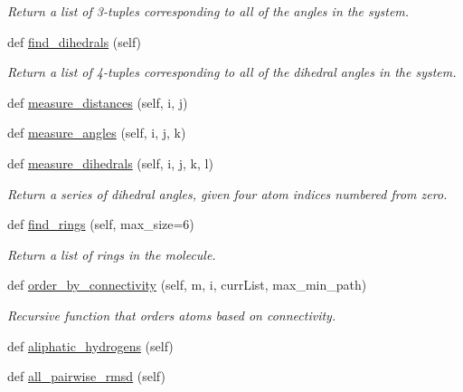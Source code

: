 \begin{DoxyCompactItemize}
\begin{DoxyCompactList}\small\item\em Return a list of 3-\/tuples corresponding to all of the angles in the system. \end{DoxyCompactList}\item 
def \hyperlink{classsrc_1_1molecule_1_1Molecule_ac07431c9d938d6f0e24e71beef9119c5}{find\+\_\+dihedrals} (self)
\begin{DoxyCompactList}\small\item\em Return a list of 4-\/tuples corresponding to all of the dihedral angles in the system. \end{DoxyCompactList}\item 
def \hyperlink{classsrc_1_1molecule_1_1Molecule_a2a818455c2439cd42f7489d3f811eb72}{measure\+\_\+distances} (self, i, j)
\item 
def \hyperlink{classsrc_1_1molecule_1_1Molecule_ad9a055066973a760e4898581224736b0}{measure\+\_\+angles} (self, i, j, k)
\item 
def \hyperlink{classsrc_1_1molecule_1_1Molecule_a4c1539dbe8854e261e7dbdb4a6fa0a98}{measure\+\_\+dihedrals} (self, i, j, k, l)
\begin{DoxyCompactList}\small\item\em Return a series of dihedral angles, given four atom indices numbered from zero. \end{DoxyCompactList}\item 
def \hyperlink{classsrc_1_1molecule_1_1Molecule_abb42e2d8a17fac1eb2a8912e1ea3a9a7}{find\+\_\+rings} (self, max\+\_\+size=6)
\begin{DoxyCompactList}\small\item\em Return a list of rings in the molecule. \end{DoxyCompactList}\item 
def \hyperlink{classsrc_1_1molecule_1_1Molecule_a5aac5225e3c6c540659410f7a783cd99}{order\+\_\+by\+\_\+connectivity} (self, m, i, curr\+List, max\+\_\+min\+\_\+path)
\begin{DoxyCompactList}\small\item\em Recursive function that orders atoms based on connectivity. \end{DoxyCompactList}\item 
def \hyperlink{classsrc_1_1molecule_1_1Molecule_ab2a58903fe3c7522158165619b92fab2}{aliphatic\+\_\+hydrogens} (self)
\item 
def \hyperlink{classsrc_1_1molecule_1_1Molecule_ac2da956804fed7a98341c94582838f26}{all\+\_\+pairwise\+\_\+rmsd} (self)

\end{DoxyCompactItemize}

